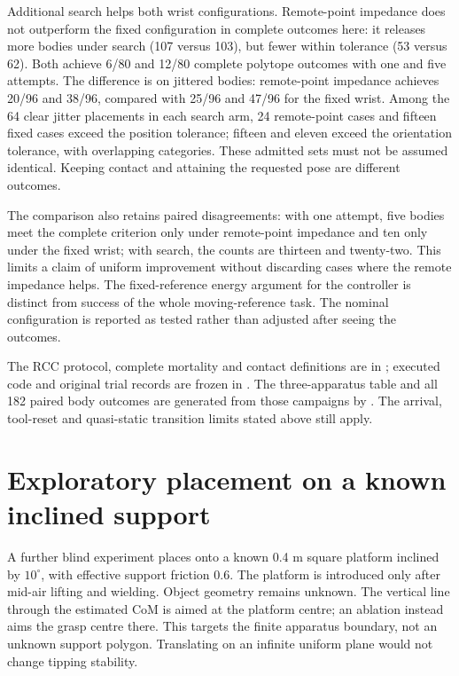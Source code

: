 Additional search helps both wrist configurations. Remote-point impedance does not outperform the fixed configuration in complete outcomes here: it releases more bodies under search (107 versus 103), but fewer within tolerance (53 versus 62). Both achieve 6/80 and 12/80 complete polytope outcomes with one and five attempts. The difference is on jittered bodies: remote-point impedance achieves 20/96 and 38/96, compared with 25/96 and 47/96 for the fixed wrist. Among the 64 clear jitter placements in each search arm, 24 remote-point cases and fifteen fixed cases exceed the position tolerance; fifteen and eleven exceed the orientation tolerance, with overlapping categories. These admitted sets must not be assumed identical. Keeping contact and attaining the requested pose are different outcomes.

The comparison also retains paired disagreements: with one attempt, five bodies meet the complete criterion only under remote-point impedance and ten only under the fixed wrist; with search, the counts are thirteen and twenty-two. This limits a claim of uniform improvement without discarding cases where the remote impedance helps. The fixed-reference energy argument for the controller is distinct from success of the whole moving-reference task. The nominal configuration is reported as tested rather than adjusted after seeing the outcomes.

The RCC protocol, complete mortality and contact definitions are in ; executed code and original trial records are frozen in . The three-apparatus table and all 182 paired body outcomes are generated from those campaigns by . The arrival, tool-reset and quasi-static transition limits stated above still apply.

\section{Exploratory placement on a known inclined support}
\label{sec:inclined-pilot}

A further blind experiment places onto a known 0.4 m square platform inclined by $10^\circ$, with effective support friction $0.6$. The platform is introduced only after mid-air lifting and wielding. Object geometry remains unknown. The vertical line through the estimated CoM is aimed at the platform centre; an ablation instead aims the grasp centre there. This targets the finite apparatus boundary, not an unknown support polygon. Translating on an infinite uniform plane would not change tipping stability.


